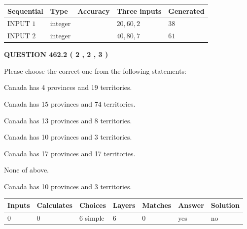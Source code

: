\documentclass[12pt]{article}
\begin{document}
  
\noindent\begin{tabular}{|l|l|l|l|l|}
\hline
 Sequential & Type & Accuracy & Three inputs & Generated \\ 
\hline
 
 
  INPUT $  1 $ & integer &  & $
 20
 , 
 60
 , 
 2
 $ & $ 38 $ 
 \\  \hline  
 
 
  INPUT $  2 $ & integer &  & $
 40
 , 
 80
 , 
 7
 $ & $ 61 $ 
 \\  \hline  
 \end{tabular}
   
   
  
\vspace{0.2in}
  
{\textbf{\Large{QUESTION
462.2 
 ( 2 , 2 , 3 )
}}}
  
  
Please choose the correct one from the following statements:
 
 
Canada has   4 provinces and  19 territories.
 
 
Canada has  15 provinces and  74 territories.
 
 
Canada has  13 provinces and  8 territories.
 
 
Canada has 10  provinces and 3 territories.
 
 
Canada has  17 provinces and  17 territories.
 
 
 None of above.
 
 
\noindent{}
 
 
Canada has 10  provinces and 3 territories.
 
 
\noindent{}
 
 
   
   
   
   
\noindent\begin{tabular}{|l|l|l|l|l|l|l|}
 \hline
Inputs & Calculates & Choices & Layers & Matches & Answer & Solution \\ \hline
 0  & 
 0  & 
 6
  simple  
  & 
 6  & 
 0  & 
  yes & 
  no 
  \\ \hline
 \end{tabular}
   
\end{document}
